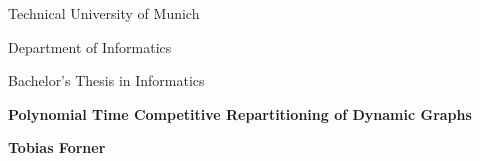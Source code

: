 
	\begin{titlepage}
		\begin{center}
			\vspace*{1cm}
			
			\large
			Technical University of Munich\\
			\vspace*{1cm}
			
			Department of Informatics\\
			\vspace*{1cm}
			
			Bachelor's Thesis in Informatics\\
			\vspace*{1cm}
			
			\Huge
			\textbf{Polynomial Time Competitive Repartitioning of Dynamic Graphs}\\
			
			
			\vspace{2cm}
			
			\Large
			\textbf{Tobias Forner}
			
			\vspace{3cm}
			
			
			
			
			\vfill
			
		\end{center}
	\end{titlepage}
	
